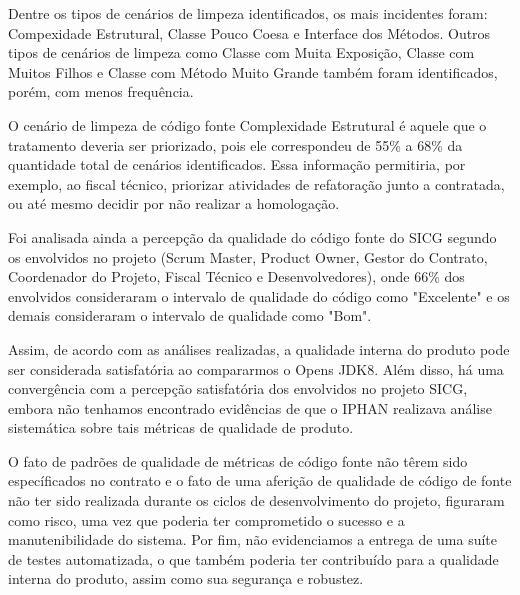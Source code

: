 Dentre os tipos de cenários de limpeza identificados, os mais incidentes foram: 
Compexidade Estrutural, Classe Pouco Coesa e Interface dos Métodos. Outros tipos de cenários de limpeza como Classe com Muita Exposição, Classe
com Muitos Filhos e Classe com Método Muito Grande também foram identificados, porém, com menos frequência.

O cenário de limpeza de código fonte Complexidade Estrutural é aquele que o tratamento deveria
ser priorizado, pois ele correspondeu de 55\% a 68\% da quantidade total de cenários identificados. Essa informação permitiria, por exemplo, ao fiscal técnico, priorizar atividades de refatoração junto  a contratada, ou até mesmo decidir por não realizar a homologação. 

Foi analisada ainda a percepção da qualidade do código fonte do SICG segundo os envolvidos no projeto (Scrum Master, Product Owner, Gestor do Contrato, Coordenador do Projeto, Fiscal Técnico e Desenvolvedores), onde 66\% dos envolvidos consideraram  o intervalo de qualidade do código como "Excelente" e os demais consideraram
o intervalo de qualidade como "Bom".

Assim, de acordo com as análises realizadas, a qualidade interna do produto pode ser considerada satisfatória ao compararmos o Opens JDK8. Além disso, há uma convergência com a percepção satisfatória dos envolvidos no projeto SICG, embora não tenhamos encontrado evidências de que o IPHAN realizava análise sistemática sobre tais métricas de qualidade de produto.

O fato de padrões de qualidade de métricas de código fonte não têrem sido específicados no contrato e o fato de uma aferição de qualidade de código de fonte não ter sido realizada durante os ciclos de desenvolvimento do projeto, figuraram como risco, uma vez que poderia ter comprometido o sucesso e a manutenibilidade do sistema. Por fim, não evidenciamos a entrega de uma suíte de testes automatizada, o que também poderia ter contribuído para a qualidade interna do produto, assim como sua segurança e robustez.